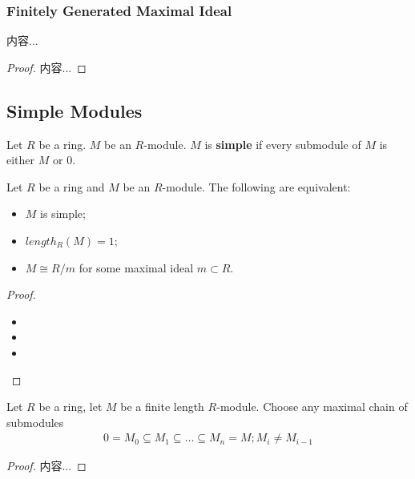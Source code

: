 \documentclass[Total.tex]{subfiles}
\begin{document}
		\subsubsection{Finitely Generated Maximal Ideal}
		
		\begin{lemma}
			内容...
		\end{lemma}
		
		\begin{proof}
			内容...
		\end{proof}
		
		\subsection{Simple Modules}
		
		\begin{Def}
			Let $R$ be a ring. $M$ be an $R$-module. $M$ is \textbf{simple} if every submodule of $M$ is either $M$ or $0$.
		\end{Def}
		
		\begin{lemma}
			Let $R$ be a ring and $M$ be an $R$-module. The following are equivalent:
			
			\begin{itemize}
				\item $M$ is simple;
				\item $length_R(M)=1$;
				\item $M\cong R/m$ for some maximal ideal $m\subset R$.
			\end{itemize}
		\end{lemma}
		
		\begin{proof}
			\begin{itemize}
				\item 
				\item 
				\item 
			\end{itemize}
		\end{proof}
		
		\begin{lemma}
			Let $R$ be a ring, let $M$ be a finite length $R$-module. Choose any maximal chain of submodules
			\begin{gather*}
				0=M_0\subseteq M_1\subseteq \dots\subseteq M_n=M;M_i\not= M_{i-1}
			\end{gather*}
		\end{lemma}
		\begin{proof}
			内容...
		\end{proof}
		
\end{document}
